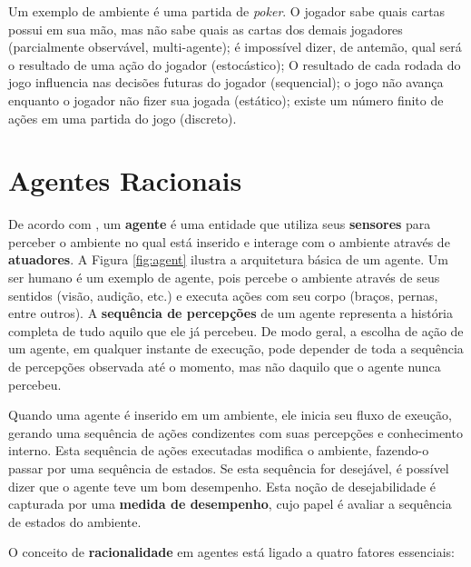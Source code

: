 Um exemplo de ambiente é uma partida de \textit{poker}. O jogador sabe quais
cartas possui em sua mão, mas não sabe quais as cartas dos demais jogadores
(parcialmente observável, multi-agente); é impossível dizer, de antemão, qual
será o resultado de uma ação do jogador (estocástico); O resultado de cada
rodada do jogo influencia nas decisões futuras do jogador (sequencial); o jogo
não avança enquanto o jogador não fizer sua jogada (estático); existe um número
finito de ações em uma partida do jogo (discreto).


\section{\label{section:agents}Agentes Racionais}
De acordo com \cite{RussellNorvig200912}, um \textbf{agente} é uma entidade que
utiliza seus \textbf{sensores} para perceber o ambiente no qual está inserido e
interage com o ambiente através de \textbf{atuadores}. A Figura \ref{fig:agent}
ilustra a arquitetura básica de um agente. Um ser humano é um exemplo de agente,
pois percebe o ambiente através de seus sentidos (visão, audição, etc.) e
executa ações com seu corpo (braços, pernas, entre outros). A \textbf{sequência
de percepções} de um agente representa a história completa de tudo aquilo que
ele já percebeu. De modo geral, a escolha de ação de um agente, em qualquer
instante de execução, pode depender de toda a sequência de percepções observada
até o momento, mas não daquilo que o agente nunca percebeu.



Quando uma agente é inserido em um ambiente, ele inicia seu fluxo de exeução,
gerando uma sequência de ações condizentes com suas percepções e conhecimento
interno. Esta sequência de ações executadas modifica o ambiente, fazendo-o
passar por uma sequência de estados. Se esta sequência for desejável, é possível
dizer que o agente teve um bom desempenho. Esta noção de desejabilidade é
capturada por uma \textbf{medida de desempenho}, cujo papel é avaliar a
sequência de estados do ambiente.

O conceito de \textbf{racionalidade} em agentes está ligado a quatro fatores
essenciais:

